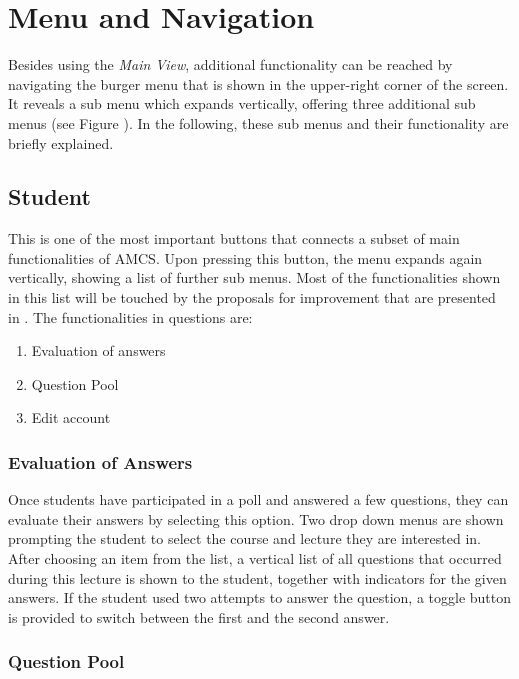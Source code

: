 \section{Menu and Navigation}
Besides using the \emph{Main View}, additional functionality can be reached by navigating the burger menu that is shown in the upper-right corner of the screen. It reveals a sub menu which expands vertically, offering three additional sub menus (see Figure \todosct). In the following, these sub menus and their functionality are briefly explained.

\subsection{Student}

This is one of the most important buttons that connects a subset of main functionalities of AMCS. Upon pressing this button, the menu expands again vertically, showing a list of further sub menus. Most of the functionalities shown in this list will be touched by the proposals for improvement that are presented in . The functionalities in questions are:

\begin{enumerate}
	\item Evaluation of answers
	\item Question Pool
	\item Edit account
\end{enumerate}

\subsubsection{Evaluation of Answers}

Once students have participated in a poll and answered a few questions, they can evaluate their answers by selecting this option. Two drop down menus are shown prompting the student to select the course and lecture they are interested in. 
After choosing an item from the list, a vertical list of all questions that occurred during this lecture is shown to the student, together with indicators for the given answers.
If the student used two attempts to answer the question, a toggle button is provided to switch between the first and the second answer. \todogrf

\subsubsection{Question Pool}

